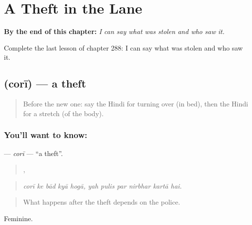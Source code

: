 
\chapter{A Theft in the Lane}
\label{ch:hi-a-theft-in-the-lane}

\begin{chapteropening}
\textbf{By the end of this chapter:} \emph{I can say what was stolen and who saw it.}

Complete the last lesson of chapter 288: I can say what was stolen and who saw it.
\end{chapteropening}

\section[\texorpdfstring{\hi{चोरी} (corī)}{चोरी (corī)}]{ (corī) — a theft}

\label{lesson:HI-C288-cori}



\begin{quote}
Before the new one: say the Hindi for turning over (in bed), then the Hindi for a stretch (of the body).
\end{quote}

\subsection*{You'll want to know: }
\textbf{} — \emph{corī} — \textquotedblleft{}a theft\textquotedblright{}.

\begin{quote}
    ,      
\end{quote}

\begin{quote}
\emph{corī ke bād kyā hogā, yah pulis par nirbhar kartā hai.}
\end{quote}

\begin{quote}
What happens after the theft depends on the police.
\end{quote}

Feminine.

